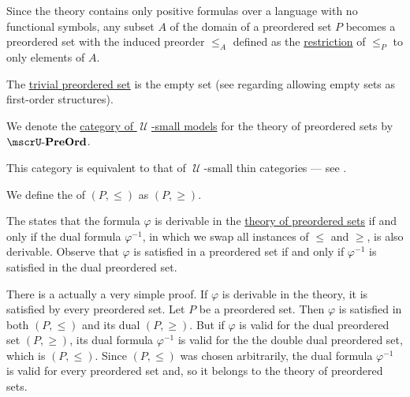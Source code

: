 \begin{definition}
\begin{thmenum}
     Since the theory contains only positive formulas over a language with no functional symbols, any subset \( A \) of the domain of a preordered set \( P \) becomes a preordered set with the induced preorder \( \leq_A \) defined as the \hyperref[def:binary_relation/restriction]{restriction} of \( \leq_P \) to only elements of \( A \).

     The \hyperref[thm:substructures_form_complete_lattice/bottom]{trivial preordered set} is the empty set (see  regarding allowing empty sets as first-order structures).

      We denote the \hyperref[def:category_of_small_first_order_models]{category of \( \mscrU \)-small models} for the theory of preordered sets by \( \ucat{PreOrd} \).

    This category is equivalent to that of \( \mscrU \)-small thin categories --- see .

     We define the  of \( (P, \leq) \) as \( (P, \geq) \).

    The  states that the formula \( \varphi \) is derivable in the \hyperref[def:preordered_set/theory]{theory of preordered sets} if and only if the dual formula \( \varphi^{-1} \), in which we swap all instances of \( \leq \) and \( \geq \), is also derivable. Observe that \( \varphi \) is satisfied in a preordered set if and only if \( \varphi^{-1} \) is satisfied in the dual preordered set.

    There is a actually a very simple proof. If \( \varphi \) is derivable in the theory, it is satisfied by every preordered set. Let \( P \) be a preordered set. Then \( \varphi \) is satisfied in both \( (P, \leq) \) and its dual \( (P, \geq) \). But if \( \varphi \) is valid for the dual preordered set \( (P, \geq) \), its dual formula \( \varphi^{-1} \) is valid for the the double dual preordered set, which is \( (P, \leq) \). Since \( (P, \leq) \) was chosen arbitrarily, the dual formula \( \varphi^{-1} \) is valid for every preordered set and, so it belongs to the theory of preordered sets.


\end{thmenum}
\end{definition}
